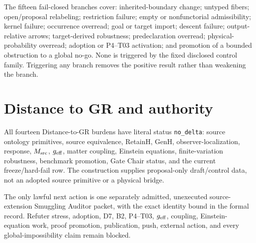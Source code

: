 \documentclass[11pt]{article}
\begin{document}
The fifteen fail-closed branches cover: inherited-boundary change; untyped
fibers; open/proposal relabeling; restriction failure; empty or nonfunctorial
admissibility; kernel failure; occurrence overread; goal or target import;
descent failure; output-relative arrows; target-derived robustness;
predeclaration overread; physical-probability overread; adoption or P4--T03
activation; and promotion of a bounded obstruction to a global no-go.  None is
triggered by the fixed disclosed control family.  Triggering any branch removes
the positive result rather than weakening the branch.

\section{Distance to GR and authority}

All fourteen Distance-to-GR burdens have literal status \texttt{no\_delta}:
source ontology primitives, source equivalence, RetainH, GenH,
observer-localization, response, $M_{\rm src}$, $g_{\rm eff}$, matter coupling,
Einstein equations, finite-variation robustness, benchmark promotion, Gate
Chair status, and the current freeze/hard-fail row.  The construction supplies
proposal-only draft/control data, not an adopted source primitive or a physical
bridge.

The only lawful next action is one separately admitted, unexecuted
source-extension Smuggling Auditor packet, with the exact identity bound in the
formal record.  Refuter stress, adoption, D7, B2,
P4--T03, $g_{\rm eff}$, coupling, Einstein-equation work, proof promotion,
publication, push, external action, and every global-impossibility claim remain
blocked.
\end{document}
